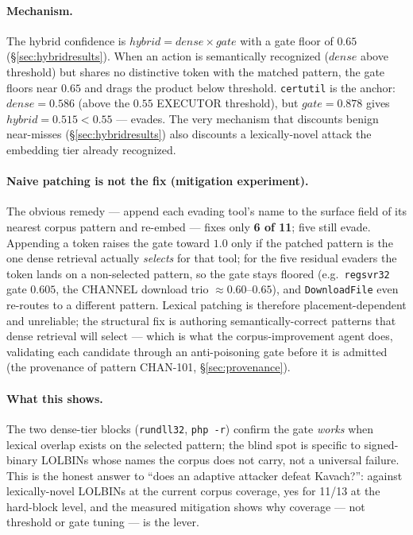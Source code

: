 \paragraph{Mechanism.} The hybrid confidence is
$\mathit{hybrid} = \mathit{dense} \times \mathit{gate}$ with a gate floor of
$0.65$ (\S\ref{sec:hybridresults}). When an action is semantically recognized
($\mathit{dense}$ above threshold) but shares no distinctive token with the
matched pattern, the gate floors near $0.65$ and drags the product below
threshold. \texttt{certutil} is the anchor: $\mathit{dense}=0.586$ (above the
$0.55$ EXECUTOR threshold), but $\mathit{gate}=0.878$ gives
$\mathit{hybrid}=0.515 < 0.55$ --- evades. The very mechanism that discounts
benign near-misses (\S\ref{sec:hybridresults}) also discounts a lexically-novel
attack the embedding tier already recognized.

\paragraph{Naive patching is not the fix (mitigation experiment).} The obvious
remedy --- append each evading tool's name to the surface field of its
nearest corpus pattern and re-embed --- fixes only \textbf{6 of 11}; five still
evade. Appending a token raises the gate toward $1.0$ only if the patched
pattern is the one dense retrieval actually \emph{selects} for that tool; for
the five residual evaders the token lands on a non-selected pattern, so the gate
stays floored (e.g.\ \texttt{regsvr32} gate $0.605$, the CHANNEL download trio
$\approx\!0.60$--$0.65$), and \texttt{DownloadFile} even re-routes to a
different pattern. Lexical patching is therefore placement-dependent and
unreliable; the structural fix is authoring semantically-correct patterns that
dense retrieval will select --- which is what the corpus-improvement agent does,
validating each candidate through an anti-poisoning gate before it is admitted
(the provenance of pattern CHAN-101, \S\ref{sec:provenance}).

\paragraph{What this shows.} The two dense-tier blocks (\texttt{rundll32},
\texttt{php\,-r}) confirm the gate \emph{works} when lexical overlap exists on
the selected pattern; the blind spot is specific to signed-binary LOLBINs whose
names the corpus does not carry, not a universal failure. This is the honest
answer to ``does an adaptive attacker defeat Kavach?'': against lexically-novel
LOLBINs at the current corpus coverage, yes for 11/13 at the hard-block level,
and the measured mitigation shows why coverage --- not threshold or gate tuning
--- is the lever.

